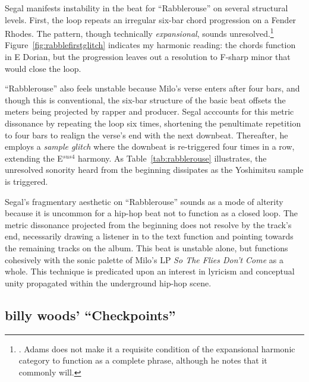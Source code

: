 Segal manifests instability in the beat for ``Rabblerouse'' on several structural levels. First, the loop repeats an irregular six-bar chord progression on a Fender Rhodes. The pattern, though technically \emph{expansional}, sounds unresolved.\footnote{\cite{kyleadamsHarmonicSyntacticMotivic2020}. Adams does not make it a requisite condition of the expansional harmonic category to function as a complete phrase, although he notes that it commonly will.} Figure~\ref{fig:rabblefirstglitch} indicates my harmonic reading: the chords function in E Dorian, but the progression leaves out a resolution to F-sharp minor that would close the loop.

``Rabblerouse'' also feels unstable because Milo's verse enters after four bars, and though this is conventional, the six-bar structure of the basic beat offsets the meters being projected by rapper and producer. Segal acccounts for this metric dissonance by repeating the loop six times, shortening the penultimate repetition to four bars to realign the verse's end with the next downbeat. Thereafter, he employs a \emph{sample glitch} where the downbeat is re-triggered four times in a row, extending the E$^{sus4}$ harmony. As Table~\ref{tab:rabblerouse} illustrates, the unresolved sonority heard from the beginning dissipates as the Yoshimitsu sample is triggered.


\normalsize Segal's fragmentary aesthetic on ``Rabblerouse'' sounds as a mode of alterity because it is uncommon for a hip-hop beat not to function as a closed loop. The metric dissonance projected from the beginning does not resolve by the track's end, necessarily drawing a listener in to the text function and pointing towards the remaining tracks on the album. This beat is unstable alone, but functions cohesively with the sonic palette of Milo's LP \textit{So The Flies Don't Come} as a whole. This technique is predicated upon an interest in lyricism and conceptual unity propagated within the underground hip-hop scene.

\subsection*{\centering billy woods' ``Checkpoints''}

